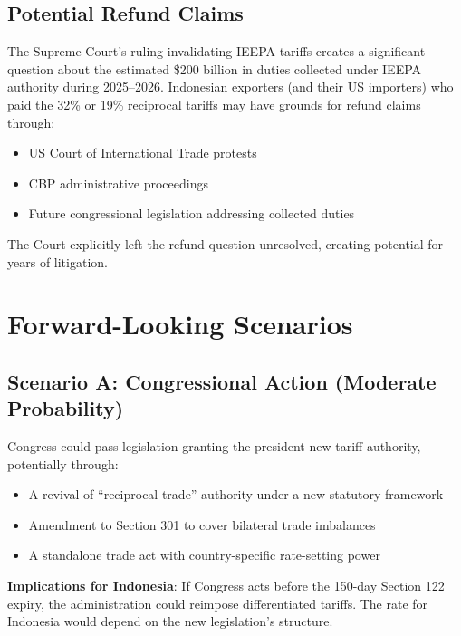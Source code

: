 \documentclass[12pt,a4paper]{article}
\begin{document}
\subsection{Potential Refund Claims}

The Supreme Court's ruling invalidating IEEPA tariffs creates a significant question about the estimated \$200 billion in duties collected under IEEPA authority during 2025--2026. Indonesian exporters (and their US importers) who paid the 32\% or 19\% reciprocal tariffs may have grounds for refund claims through:

\begin{itemize}
    \item US Court of International Trade protests
    \item CBP administrative proceedings
    \item Future congressional legislation addressing collected duties
\end{itemize}

The Court explicitly left the refund question unresolved, creating potential for years of litigation.

\section{Forward-Looking Scenarios}

\subsection{Scenario A: Congressional Action (Moderate Probability)}

Congress could pass legislation granting the president new tariff authority, potentially through:
\begin{itemize}
    \item A revival of ``reciprocal trade'' authority under a new statutory framework
    \item Amendment to Section 301 to cover bilateral trade imbalances
    \item A standalone trade act with country-specific rate-setting power
\end{itemize}

\textbf{Implications for Indonesia}: If Congress acts before the 150-day Section 122 expiry, the administration could reimpose differentiated tariffs. The rate for Indonesia would depend on the new legislation's structure.
\end{document}

